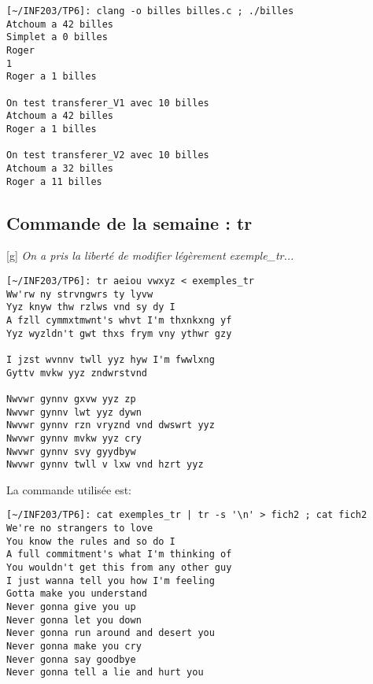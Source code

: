 \documentclass[12pt,a4paper,notitlepage,colorinlistoftodos]{article}
\begin{document}
\begin{lstlisting}
[~/INF203/TP6]: clang -o billes billes.c ; ./billes
Atchoum a 42 billes
Simplet a 0 billes
Roger
1
Roger a 1 billes

On test transferer_V1 avec 10 billes
Atchoum a 42 billes
Roger a 1 billes

On test transferer_V2 avec 10 billes
Atchoum a 32 billes
Roger a 11 billes
\end{lstlisting}

\newpage

\subsection*{Commande de la semaine : \textbf{tr}}

[g]
\textit{On a pris la liberté de modifier légèrement exemple\_tr...}
\begin{lstlisting}
[~/INF203/TP6]: tr aeiou vwxyz < exemples_tr 
Ww'rw ny strvngwrs ty lyvw
Yyz knyw thw rzlws vnd sy dy I
A fzll cymmxtmwnt's whvt I'm thxnkxng yf
Yyz wyzldn't gwt thxs frym vny ythwr gzy

I jzst wvnnv twll yyz hyw I'm fwwlxng
Gyttv mvkw yyz zndwrstvnd

Nwvwr gynnv gxvw yyz zp
Nwvwr gynnv lwt yyz dywn
Nwvwr gynnv rzn vryznd vnd dwswrt yyz
Nwvwr gynnv mvkw yyz cry
Nwvwr gynnv svy gyydbyw
Nwvwr gynnv twll v lxw vnd hzrt yyz
\end{lstlisting}

La commande utilisée est:
\begin{lstlisting}
[~/INF203/TP6]: cat exemples_tr | tr -s '\n' > fich2 ; cat fich2
We're no strangers to love
You know the rules and so do I
A full commitment's what I'm thinking of
You wouldn't get this from any other guy
I just wanna tell you how I'm feeling
Gotta make you understand
Never gonna give you up
Never gonna let you down
Never gonna run around and desert you
Never gonna make you cry
Never gonna say goodbye
Never gonna tell a lie and hurt you
\end{lstlisting}


\cite{}


\end{document}
